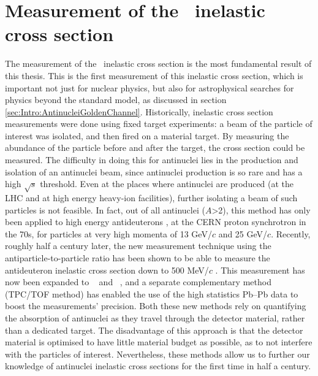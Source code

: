 







\section{Measurement of the \ahe\ inelastic cross section}\label{sec:ResHe3SigmaInel}
The measurement of the \ahe\ inelastic cross section is the most fundamental result of this thesis. This is the first measurement of this inelastic cross section, which is important not just for nuclear physics, but also for astrophysical searches for physics beyond the standard model, as discussed in section \ref{sec:Intro:AntinucleiGoldenChannel}. Historically, inelastic cross section measurements were done using fixed target experiments: a beam of the particle of interest was isolated, and then fired on a material target. By measuring the abundance of the particle before and after the target, the cross section could be measured. The difficulty in doing this for antinuclei lies in the production and isolation of an antinuclei beam, since antinuclei production is so rare and has a high $\sqrt{s}$ threshold. Even at the places where antinuclei are produced (at the LHC and at high energy heavy-ion facilities\cite{}), further isolating a beam of such particles is not feasible. In fact, out of all antinuclei ($A$>2), this method has only been applied to high energy antideuterons \cite{Binon:1970yu, Denisov:1971im}, at the CERN proton synchrotron in the 70s, for particles at very high momenta of 13 GeV/$c$ and 25 GeV/$c$. Recently, roughly half a century later, the new measurement technique using the antiparticle-to-particle ratio has been shown to be able to measure the antideuteron inelastic cross section down to 500 MeV/$c$ \cite{antideuteronXS}. This measurement has now been expanded to \ahe\ \cite{antiHe3XS} and \atrit\ , and a separate complementary method (TPC/TOF method) has enabled the use of the high statistics Pb--Pb data to boost the measurements' precision. Both these new methods rely on quantifying the absorption of antinuclei as they travel through the detector material, rather than a dedicated target. The disadvantage of this approach is that the detector material is optimised to have little material budget as possible, as to not interfere with the particles of interest. Nevertheless, these methods allow us to further our knowledge of antinuclei inelastic cross sections for the first time in half a century.

